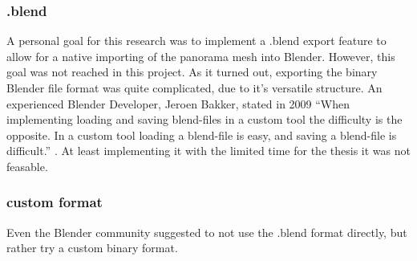 \subsubsection{.blend}

A personal goal for this research was to implement a .blend export feature to allow for a native importing of the panorama mesh into Blender. However, this goal was not reached in this project. As it turned out, exporting the binary Blender file format was quite complicated, due to it's versatile structure. An experienced Blender Developer, Jeroen Bakker, stated in 2009 “When implementing loading and saving blend-files in a custom tool the difficulty is the opposite. In a custom tool loading a blend-file is easy, and saving a blend-file is difficult.” \parencite[see]{webMysteryOfTheBlend}. At least implementing it with the limited time for the thesis it was not feasable.



\subsubsection{custom format}

Even the Blender community suggested to not use the .blend format directly, but rather try a custom binary format. \parencite[compare]{webBlenderArtistsBlendExport}